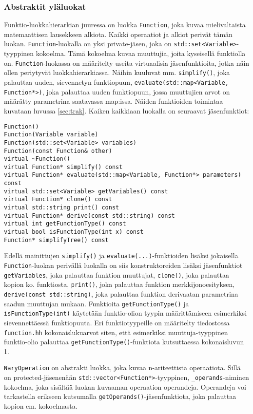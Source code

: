 \documentclass[10pt,a4paper]{article}
\begin{document}
\subsubsection{Abstraktit yläluokat}
Funktio-luokkahierarkian juuressa on luokka \lstinline!Function!, joka kuvaa mielivaltaista matemaattisen lausekkeen alkiota. Kaikki operaatiot ja alkiot perivät tämän luokan. \lstinline!Function!-luokalla on yksi private-jäsen, joka on \lstinline!std::set<Variable>!-tyyppinen kokoelma. Tämä kokoelma kuvaa muuttujia, joita kyseisellä funktiolla on. \lstinline!Function!-luokassa on määritelty useita virtuaalisia jäsenfunktioita, jotka näin ollen periytyvät luokkahierarkiassa. Näihin kuuluvat mm. \lstinline!simplify()!, joka palauttaa uuden, sievennetyn funktiopuun, \lstinline!evaluate(std::map<Variable, Function*>)!, joka palauttaa uuden funktiopuun, jossa muuttujien arvot on määrätty parametrina saatavassa map:issa. Näiden funktioiden toimintaa kuvataan luvussa \ref{sec:trak}. Kaiken kaikkiaan luokalla on seuraavat jäsenfunktiot:
\begin{lstlisting}
Function()
Function(Variable variable)
Function(std::set<Variable> variables)
Function(const Function& other)
virtual ~Function()
virtual Function* simplify() const 
virtual Function* evaluate(std::map<Variable, Function*> parameters) const
virtual std::set<Variable> getVariables() const
virtual Function* clone() const
virtual std::string print() const
virtual Function* derive(const std::string) const
virtual int getFunctionType() const
virtual bool isFunctionType(int x) const
Function* simplifyTree() const
\end{lstlisting}
Edellä mainittujen \lstinline!simplify()! ja \lstinline!evaluate(...)!-funktioiden lisäksi jokaisella \lstinline!Function!-luokan perivällä luokalla on siis konstruktoreiden lisäksi jäsenfunktiot \lstinline!getVariables!, joka palauttaa funktion muuttujat, \lstinline!clone()!, joka palauttaa kopion ko. funktiosta, \lstinline!print()!, joka palauttaa funktion merkkijonoesityksen, \lstinline!derive(const std::string)!, joka palauttaa funktion derivaatan parametrina saadun muuttujan mukaan. Funktioita \lstinline!getFunctionType()! ja \lstinline!isFunctionType(int)! käytetään funktio-olion tyypin määrittämiseen esimerkiksi sievennettäessä funktiopuuta. Eri funktiotyypeille on määritelty tiedostossa \texttt{function.hh} kokonaislukuarvot siten, että esimerkiksi muuttuja-tyyppinen funktio-olio palauttaa \lstinline!getFunctionType()!-funktiota kutsuttaessa kokonaisluvun 1.


\lstinline!NaryOperation! on abstrakti luokka, joka kuvaa n-ariteettista operaatiota. Sillä on protected-jäsenenään
\lstinline!std::vector<Function*>!-tyyppinen, \lstinline!_operands!-niminen kokoelma, joka sisältää luokan kuvaaman operaation operandeja. Operandeja voi tarkastella erikseen kutsumalla \lstinline!getOperands()!-jäsenfunktiota, joka palauttaa kopion em. kokoelmasta.
\end{document}
